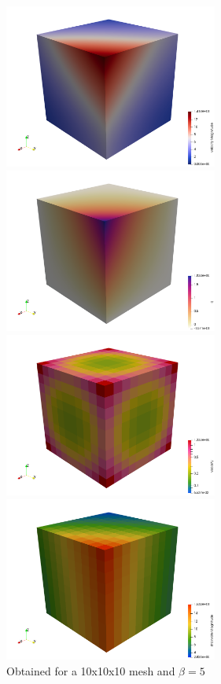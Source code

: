 \begin{center}
\includegraphics[width=7cm]{python_codes/fieldstone_17/results_beta5/velocity}
\includegraphics[width=7cm]{python_codes/fieldstone_17/results_beta5/q}\\
\includegraphics[width=7cm]{python_codes/fieldstone_17/results_beta5/eta}
\includegraphics[width=7cm]{python_codes/fieldstone_17/results_beta5/sr}\\
{\captionfont Obtained for a 10x10x10 mesh and $\beta=5$}
\end{center}

















